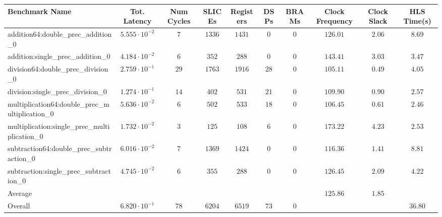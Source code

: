 \begin{tabular}{|l|c|c|c|c|c|c|c|c|c|}
\hline
Benchmark Name                                   & Tot. Latency            & Num Cycles & SLICEs   & Registers & DSPs   & BRAMs & Clock Frequency & Clock Slack & HLS Time(s) \\
\hline
addition64:double\_prec\_addition\_0             & $ 5.555 \cdot 10^{-2} $ & $ 7      $ & $ 1336 $ & $ 1431  $ & $ 0  $ & $ 0 $ & $ 126.01      $ & $ 2.06    $ & $ 8.69    $ \\
addition:single\_prec\_addition\_0               & $ 4.184 \cdot 10^{-2} $ & $ 6      $ & $ 352  $ & $ 288   $ & $ 0  $ & $ 0 $ & $ 143.41      $ & $ 3.03    $ & $ 3.47    $ \\
division64:double\_prec\_division\_0             & $ 2.759 \cdot 10^{-1} $ & $ 29     $ & $ 1763 $ & $ 1916  $ & $ 28 $ & $ 0 $ & $ 105.11      $ & $ 0.49    $ & $ 4.05    $ \\
division:single\_prec\_division\_0               & $ 1.274 \cdot 10^{-1} $ & $ 14     $ & $ 402  $ & $ 531   $ & $ 21 $ & $ 0 $ & $ 109.90      $ & $ 0.90    $ & $ 2.57    $ \\
multiplication64:double\_prec\_multiplication\_0 & $ 5.636 \cdot 10^{-2} $ & $ 6      $ & $ 502  $ & $ 533   $ & $ 18 $ & $ 0 $ & $ 106.45      $ & $ 0.61    $ & $ 2.46    $ \\
multiplication:single\_prec\_multiplication\_0   & $ 1.732 \cdot 10^{-2} $ & $ 3      $ & $ 125  $ & $ 108   $ & $ 6  $ & $ 0 $ & $ 173.22      $ & $ 4.23    $ & $ 2.53    $ \\
subtraction64:double\_prec\_subtraction\_0       & $ 6.016 \cdot 10^{-2} $ & $ 7      $ & $ 1369 $ & $ 1424  $ & $ 0  $ & $ 0 $ & $ 116.36      $ & $ 1.41    $ & $ 8.81    $ \\
subtraction:single\_prec\_subtraction\_0         & $ 4.745 \cdot 10^{-2} $ & $ 6      $ & $ 355  $ & $ 288   $ & $ 0  $ & $ 0 $ & $ 126.45      $ & $ 2.09    $ & $ 4.22    $ \\
\hline
Average                                          & $                     $ & $        $ & $      $ & $       $ & $    $ & $   $ & $ 125.86      $ & $ 1.85    $ & $         $ \\
\hline
Overall                                          & $ 6.820 \cdot 10^{-1} $ & $ 78     $ & $ 6204 $ & $ 6519  $ & $ 73 $ & $ 0 $ & $             $ & $         $ & $ 36.80   $ \\
\hline
\end{tabular}
